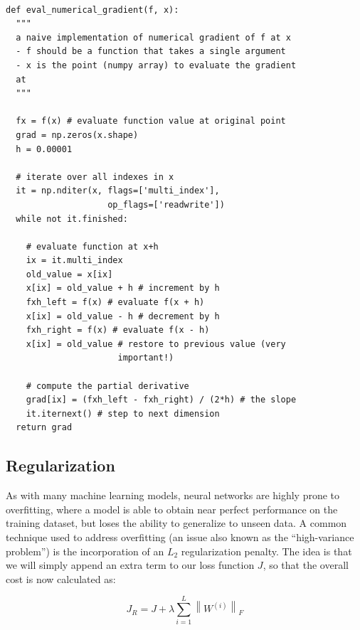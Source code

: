 \documentclass{tufte-handout}
\newcommand{\norm}[1]{\left\lVert#1\right\rVert}
\begin{document}
\begin{theorem}
\begin{verbatim}

def eval_numerical_gradient(f, x):
  """ 
  a naive implementation of numerical gradient of f at x 
  - f should be a function that takes a single argument
  - x is the point (numpy array) to evaluate the gradient 
  at
  """ 

  fx = f(x) # evaluate function value at original point
  grad = np.zeros(x.shape)
  h = 0.00001

  # iterate over all indexes in x
  it = np.nditer(x, flags=['multi_index'], 
  	                op_flags=['readwrite'])
  while not it.finished:

    # evaluate function at x+h
    ix = it.multi_index
    old_value = x[ix]
    x[ix] = old_value + h # increment by h
    fxh_left = f(x) # evaluate f(x + h)
    x[ix] = old_value - h # decrement by h
    fxh_right = f(x) # evaluate f(x - h)
    x[ix] = old_value # restore to previous value (very 
    			      important!)

    # compute the partial derivative
    grad[ix] = (fxh_left - fxh_right) / (2*h) # the slope
    it.iternext() # step to next dimension
  return grad  
\end{verbatim}
\label{snip:gradcheck}
\end{theorem}
\subsection{Regularization}

As with many machine learning models, neural networks are highly prone to overfitting, where a model is able to obtain near perfect performance on the training dataset, but loses the ability to generalize to unseen data. A common technique used to address overfitting (an issue also known as the ``high-variance problem'') is the incorporation of an $L_2$ regularization penalty. The idea is that we will simply append an extra term to our loss function $J$, so that the overall cost is now calculated as:

$$J_R = J + \lambda \sum_{i = 1}^{L} \norm{W^{(i)}}_F$$
\end{document}
